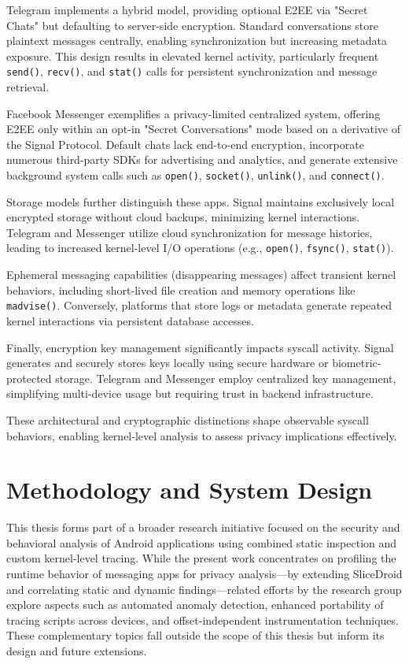 \documentclass[a4paper,12pt]{report}
\begin{document}
Telegram implements a hybrid model, providing optional E2EE via "Secret Chats" but defaulting to server-side encryption. Standard conversations store plaintext messages centrally, enabling synchronization but increasing metadata exposure. This design results in elevated kernel activity, particularly frequent \texttt{send()}, \texttt{recv()}, and \texttt{stat()} calls for persistent synchronization and message retrieval.

Facebook Messenger exemplifies a privacy-limited centralized system, offering E2EE only within an opt-in "Secret Conversations" mode based on a derivative of the Signal Protocol. Default chats lack end-to-end encryption, incorporate numerous third-party SDKs for advertising and analytics, and generate extensive background system calls such as \texttt{open()}, \texttt{socket()}, \texttt{unlink()}, and \texttt{connect()}.

Storage models further distinguish these apps. Signal maintains exclusively local encrypted storage without cloud backups, minimizing kernel interactions. Telegram and Messenger utilize cloud synchronization for message histories, leading to increased kernel-level I/O operations (e.g., \texttt{open()}, \texttt{fsync()}, \texttt{stat()}).

Ephemeral messaging capabilities (disappearing messages) affect transient kernel behaviors, including short-lived file creation and memory operations like \texttt{madvise()}. Conversely, platforms that store logs or metadata generate repeated kernel interactions via persistent database accesses.

Finally, encryption key management significantly impacts syscall activity. Signal generates and securely stores keys locally using secure hardware or biometric-protected storage. Telegram and Messenger employ centralized key management, simplifying multi-device usage but requiring trust in backend infrastructure.

These architectural and cryptographic distinctions shape observable syscall behaviors, enabling kernel-level analysis to assess privacy implications effectively.

\chapter{Methodology and System Design}

This thesis forms part of a broader research initiative focused on the security and behavioral analysis of Android applications using combined static inspection and custom kernel-level tracing. While the present work concentrates on profiling the runtime behavior of messaging apps for privacy analysis—by extending SliceDroid and correlating static and dynamic findings—related efforts by the research group explore aspects such as automated anomaly detection, enhanced portability of tracing scripts across devices, and offset-independent instrumentation techniques. These complementary topics fall outside the scope of this thesis but inform its design and future extensions.
\end{document}

